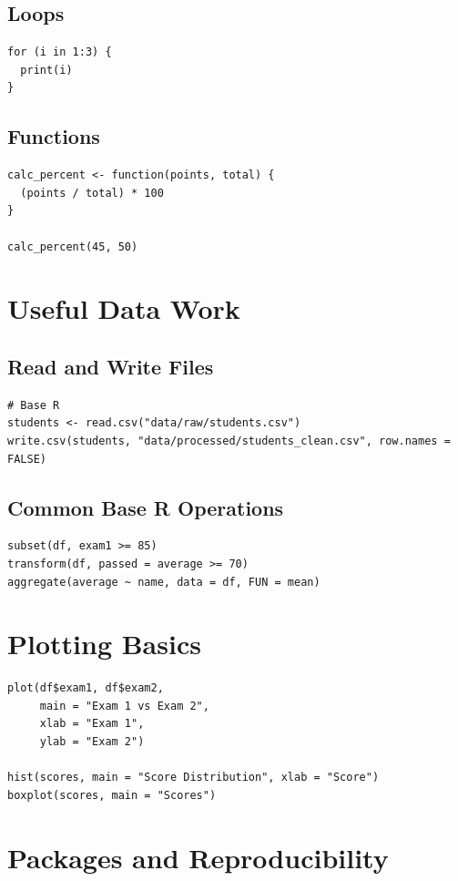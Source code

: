 \documentclass[11pt]{article}
\begin{document}
\subsection{Loops}
\begin{verbatim}
for (i in 1:3) {
  print(i)
}
\end{verbatim}

\subsection{Functions}
\begin{verbatim}
calc_percent <- function(points, total) {
  (points / total) * 100
}

calc_percent(45, 50)
\end{verbatim}

\section{Useful Data Work}
\subsection{Read and Write Files}
\begin{verbatim}
# Base R
students <- read.csv("data/raw/students.csv")
write.csv(students, "data/processed/students_clean.csv", row.names = FALSE)
\end{verbatim}

\subsection{Common Base R Operations}
\begin{verbatim}
subset(df, exam1 >= 85)
transform(df, passed = average >= 70)
aggregate(average ~ name, data = df, FUN = mean)
\end{verbatim}

\section{Plotting Basics}
\begin{verbatim}
plot(df$exam1, df$exam2,
     main = "Exam 1 vs Exam 2",
     xlab = "Exam 1",
     ylab = "Exam 2")

hist(scores, main = "Score Distribution", xlab = "Score")
boxplot(scores, main = "Scores")
\end{verbatim}

\section{Packages and Reproducibility}
\end{document}
